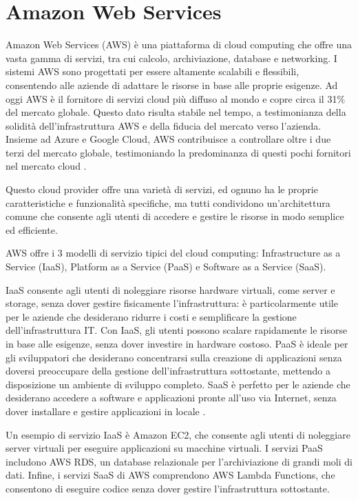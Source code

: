 \section{Amazon Web Services}
\label{sec:aws}

Amazon Web Services (AWS) è una piattaforma di cloud computing che offre una vasta gamma di servizi, tra cui calcolo, archiviazione, database e networking. I sistemi AWS sono progettati per essere altamente scalabili e flessibili, consentendo alle aziende di adattare le risorse in base alle proprie esigenze. Ad oggi AWS è il fornitore di servizi cloud più diffuso al mondo e copre circa il 31\% del mercato globale. Questo dato risulta stabile nel tempo, a testimonianza della solidità dell'infrastruttura AWS e della fiducia del mercato verso l'azienda. Insieme ad Azure e Google Cloud, AWS contribuisce a controllare oltre i due terzi del mercato globale, testimoniando la predominanza di questi pochi fornitori nel mercato cloud \cite{statista2024awsmarketshare}.

Questo cloud provider offre una varietà di servizi, ed ognuno ha le proprie caratteristiche e funzionalità specifiche, ma tutti condividono un'architettura comune che consente agli utenti di accedere e gestire le risorse in modo semplice ed efficiente.

AWS offre i 3 modelli di servizio tipici del cloud computing: Infrastructure as a Service (IaaS), Platform as a Service (PaaS) e Software as a Service (SaaS).

IaaS consente agli utenti di noleggiare risorse hardware virtuali, come server e storage, senza dover gestire fisicamente l'infrastruttura: è particolarmente utile per le aziende che desiderano ridurre i costi e semplificare la gestione dell'infrastruttura IT. Con IaaS, gli utenti possono scalare rapidamente le risorse in base alle esigenze, senza dover investire in hardware costoso. PaaS è ideale per gli sviluppatori che desiderano concentrarsi sulla creazione di applicazioni senza doversi preoccupare della gestione dell'infrastruttura sottostante, mettendo a disposizione un ambiente di sviluppo completo. SaaS è perfetto per le aziende che desiderano accedere a software e applicazioni pronte all'uso via Internet, senza dover installare e gestire applicazioni in locale \cite{10823401}.

Un esempio di servizio IaaS è Amazon EC2, che consente agli utenti di noleggiare server virtuali per eseguire applicazioni su macchine virtuali. I servizi PaaS includono AWS RDS, un database relazionale per l'archiviazione di grandi moli di dati. Infine, i servizi SaaS di AWS comprendono AWS Lambda Functions, che consentono di eseguire codice senza dover gestire l'infrastruttura sottostante.

